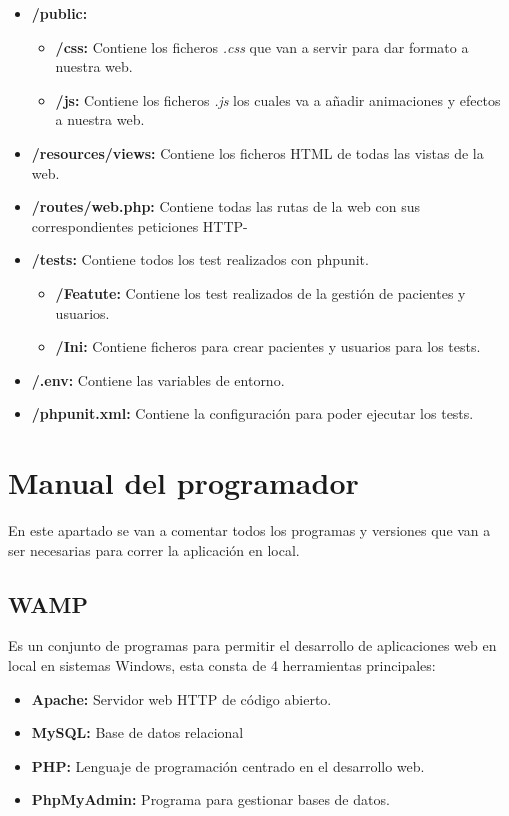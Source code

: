 \begin{itemize}
\begin{itemize}
    \end{itemize}
    \item \textbf{/public:} 
    \begin{itemize}
        \item \textbf{/css:} Contiene los ficheros \textit{.css} que van a servir para dar formato a nuestra web.
        \item \textbf{/js:} Contiene los ficheros \textit{.js} los cuales va a añadir animaciones y efectos a nuestra web.
    \end{itemize}
    \item \textbf{/resources/views:} Contiene los ficheros HTML de todas las vistas de la web.
    \item \textbf{/routes/web.php:} Contiene todas las rutas de la web con sus correspondientes peticiones HTTP-
    \item \textbf{/tests:} Contiene todos los test realizados con phpunit.
    \begin{itemize}
        \item \textbf{/Featute:} Contiene los test realizados de la gestión de pacientes y usuarios.
        \item \textbf{/Ini:} Contiene ficheros para crear pacientes y usuarios para los tests.
    \end{itemize}
    \item \textbf{/.env:} Contiene las variables de entorno.
    \item \textbf{/phpunit.xml:} Contiene la configuración para poder ejecutar los tests.
\end{itemize}

\section{Manual del programador} \label{manual}

En este apartado se van a comentar todos los programas y versiones que van a ser necesarias para correr la aplicación en local.

\subsection{WAMP}

Es un conjunto de programas para permitir el desarrollo de aplicaciones web en local en sistemas Windows, esta consta de 4 herramientas principales:
\begin{itemize}
    \item \textbf{Apache:} Servidor web HTTP de código abierto.
    \item \textbf{MySQL:} Base de datos relacional 
    \item \textbf{PHP:} Lenguaje de programación centrado en el desarrollo web.
    \item \textbf{PhpMyAdmin:} Programa para gestionar bases de datos.
\end{itemize}


